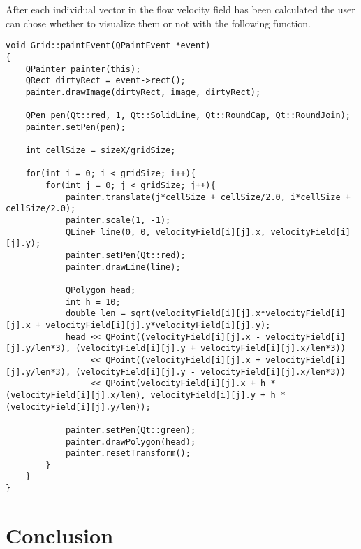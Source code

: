 \documentclass[12pt, titlepage]{article}
\begin{document}
After each individual vector in the flow velocity field has been calculated the user can chose whether to visualize them or not with the following function.

\begin{lstlisting}
void Grid::paintEvent(QPaintEvent *event)
{
    QPainter painter(this);
    QRect dirtyRect = event->rect();
    painter.drawImage(dirtyRect, image, dirtyRect);

    QPen pen(Qt::red, 1, Qt::SolidLine, Qt::RoundCap, Qt::RoundJoin);
    painter.setPen(pen);

    int cellSize = sizeX/gridSize;

    for(int i = 0; i < gridSize; i++){
        for(int j = 0; j < gridSize; j++){
            painter.translate(j*cellSize + cellSize/2.0, i*cellSize + cellSize/2.0);
            painter.scale(1, -1);
            QLineF line(0, 0, velocityField[i][j].x, velocityField[i][j].y);
            painter.setPen(Qt::red);
            painter.drawLine(line);

            QPolygon head;
            int h = 10;
            double len = sqrt(velocityField[i][j].x*velocityField[i][j].x + velocityField[i][j].y*velocityField[i][j].y);
            head << QPoint((velocityField[i][j].x - velocityField[i][j].y/len*3), (velocityField[i][j].y + velocityField[i][j].x/len*3))
                 << QPoint((velocityField[i][j].x + velocityField[i][j].y/len*3), (velocityField[i][j].y - velocityField[i][j].x/len*3))
                 << QPoint(velocityField[i][j].x + h * (velocityField[i][j].x/len), velocityField[i][j].y + h * (velocityField[i][j].y/len));

            painter.setPen(Qt::green);
            painter.drawPolygon(head);
            painter.resetTransform();
        }
    }
}
\end{lstlisting}

\section{Conclusion}
\end{document}
